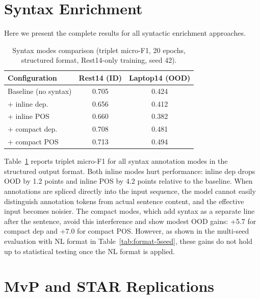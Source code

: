 \documentclass[12pt,a4paper]{report}
\begin{document}
\section{Syntax Enrichment}\label{sec:syntax-results}


Here we present the complete results for all syntactic enrichment approaches. 

\begin{table}[H]
\centering
\caption{Syntax modes comparison (triplet micro-F1, 20 epochs, structured format, Rest14-only training, seed 42).}
\label{tab:syntax-inline}
\small
\begin{tabular}{@{}lcc@{}}
\toprule
\textbf{Configuration} & \textbf{Rest14 (ID)} & \textbf{Laptop14 (OOD)} \\
\midrule
Baseline (no syntax) & 0.705 & 0.424 \\
+ inline dep. & 0.656 & 0.412 \\
+ inline POS & 0.660 & 0.382 \\
+ compact dep. & 0.708 & 0.481 \\
+ compact POS & 0.713 & 0.494 \\
\bottomrule
\end{tabular}
\end{table}

Table~\ref{tab:syntax-inline} reports triplet micro-F1 for all syntax annotation modes in the structured output format. Both inline modes hurt performance: inline dep drops OOD by 1.2 points and inline POS by 4.2 points relative to the baseline. When annotations are spliced directly into the input sequence, the model cannot easily distinguish annotation tokens from actual sentence content, and the effective input becomes noisier. The compact modes, which add syntax as a separate line after the sentence, avoid this interference and show modest OOD gains: +5.7 for compact dep and +7.0 for compact POS. However, as shown in the multi-seed evaluation with NL format in Table~\ref{tab:format-5seed}, these gains do not hold up to statistical testing once the NL format is applied.


\section{MvP and STAR Replications}\label{sec:mvp-star}
\end{document}
